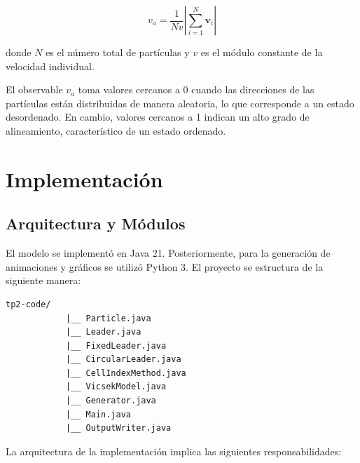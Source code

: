 \documentclass[a4paper,12pt]{article}
\begin{document}
\begin{equation}
	v_a = \frac{1}{N v} \left| \sum_{i=1}^{N} \bm{v}_i \right|
\end{equation}

donde $N$ es el número total de partículas y $v$ es el módulo constante de la velocidad individual.

El observable $v_a$ toma valores cercanos a 0 cuando las direcciones de las partículas están distribuidas de manera aleatoria, lo que corresponde a un estado desordenado. En cambio, valores cercanos a 1 indican un alto grado de alineamiento, característico de un estado ordenado.

\section{Implementación}

\subsection{Arquitectura y Módulos}

El modelo se implementó en Java 21. Posteriormente, para la generación de animaciones y gráficos se utilizó Python 3. El proyecto se estructura de la siguiente manera:

\begin{center}
	\begin{minipage}{0.55\textwidth}
		\begin{Verbatim}[gobble=3]
			tp2-code/
			|__ Particle.java
			|__ Leader.java
			|__ FixedLeader.java
			|__ CircularLeader.java
			|__ CellIndexMethod.java
			|__ VicsekModel.java
			|__ Generator.java
			|__ Main.java
			|__ OutputWriter.java
		\end{Verbatim}
	\end{minipage}
\end{center}

La arquitectura de la implementación implica las siguientes responsabilidades:
\end{document}
